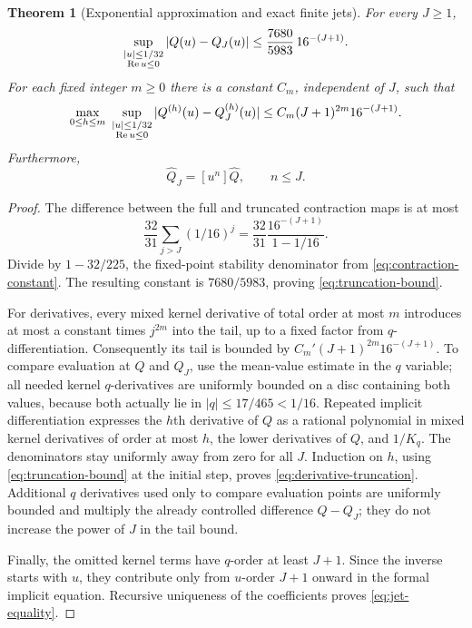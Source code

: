 \documentclass[11pt,a4paper]{article}
\numberwithin{equation}{section}
\newtheorem{theorem}{Theorem}[section]
\theoremstyle{definition}
\theoremstyle{remark}
\newcommand{\Ree}{\operatorname{Re}}
\newcommand{\Q}{\widehat Q}
\begin{document}
\begin{theorem}[Exponential approximation and exact finite jets]
\label{thm:truncation}
For every $J\ge1$,
\begin{equation}
 \sup_{\substack{|u|\le1/32\cr\Ree u\le0}}
   |Q(u)-Q_J(u)|
       \le\frac{7680}{5983}\,16^{-(J+1)}.
 \label{eq:truncation-bound}
\end{equation}
For each fixed integer $m\ge0$ there is a constant $C_m$, independent
of $J$, such that
\begin{equation}
 \max_{0\le h\le m}\ 
 \sup_{\substack{|u|\le1/32\cr\Ree u\le0}}
       |Q^{(h)}(u)-Q_J^{(h)}(u)|
       \le C_m(J+1)^{2m}16^{-(J+1)}.
 \label{eq:derivative-truncation}
\end{equation}
Furthermore,
\begin{equation}
 [u^n]\widehat Q_J=[u^n]\Q,\qquad n\le J.
 \label{eq:jet-equality}
\end{equation}
\end{theorem}

\begin{proof}
The difference between the full and truncated contraction maps is at most
\[
 \frac{32}{31}\sum_{j>J}(1/16)^j
       =\frac{32}{31}\frac{16^{-(J+1)}}{1-1/16}.
\]
Divide by $1-32/225$, the fixed-point stability denominator from
\eqref{eq:contraction-constant}.  The resulting constant is
$7680/5983$, proving \eqref{eq:truncation-bound}.

For derivatives, every mixed kernel derivative of total order at most
$m$ introduces at most a constant times $j^{2m}$ into the tail, up to a
fixed factor from $q$-differentiation.  Consequently its tail is bounded by
$C_m'(J+1)^{2m}16^{-(J+1)}$.  To compare evaluation at $Q$ and $Q_J$,
use the mean-value estimate in the $q$ variable; all needed kernel
$q$-derivatives are uniformly bounded on a disc containing both values,
because both actually lie in $|q|\le17/465<1/16$.
Repeated implicit differentiation expresses the $h$th derivative of
$Q$ as a rational polynomial in mixed kernel derivatives of order at
most $h$, the lower derivatives of $Q$, and $1/K_q$.
The denominators stay uniformly away from zero for all $J$.
Induction on $h$, using \eqref{eq:truncation-bound} at the initial step,
proves \eqref{eq:derivative-truncation}.  Additional $q$ derivatives used
only to compare evaluation points are uniformly bounded and multiply
the already controlled difference $Q-Q_J$; they do not increase the
power of $J$ in the tail bound.

Finally, the omitted kernel terms have $q$-order at least $J+1$.
Since the inverse starts with $u$, they contribute only from $u$-order
$J+1$ onward in the formal implicit equation.  Recursive uniqueness of
the coefficients proves \eqref{eq:jet-equality}.
\end{proof}
\end{document}
